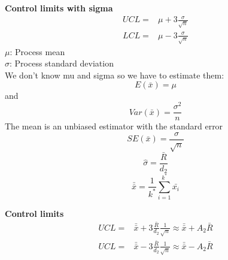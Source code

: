 \textbf{Control limits with sigma}
\begin{equation}
  \begin{split}
    UCL =& \mu + 3 \frac{\sigma}{\sqrt{n}}\\
    LCL =& \mu - 3 \frac{\sigma}{\sqrt{n}}
  \end{split}
\end{equation}
$\mu$: Process mean\\
$\sigma$: Process standard deviation\\
We don't know mu and sigma so we have to estimate them:
\begin{equation}
  E\left(\bar{x}\right) = \mu
\end{equation}
and
\begin{equation}
  Var\left(\bar{x}\right) = \frac{\sigma^2}{n}
\end{equation}
The mean is an unbiased estimator with the standard error
\begin{equation}
  SE\left(\bar{x}\right) = \frac{\sigma}{\sqrt{n}}
\end{equation}
\begin{equation}
  \hat{\sigma} = \frac{\bar{R}}{d_2}
\end{equation}
\begin{equation}
  \bar{\bar{x}} = \frac{1}{k^*} \sum^{k^*}_{i=1} \bar{x_i}
\end{equation}

\textbf{Control limits}
\begin{equation}
  \begin{split}
    UCL =& \bar{\bar{x}} + 3\frac{\bar{R}}{d_2} \frac{1}{\sqrt{n}}\approx \bar{\bar{x}} + A_2 \bar{R}\\
    UCL =& \bar{\bar{x}} - 3\frac{\bar{R}}{d_2} \frac{1}{\sqrt{n}}\approx \bar{\bar{x}} - A_2 \bar{R}
  \end{split}
\end{equation}
